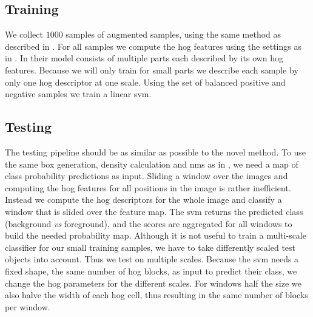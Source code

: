\subsection{Training}
We collect $1000$ samples of augmented samples, using the same method as described in . For all samples we compute the \gls{hog} features using the settings as in \citep{dalal_histograms_2005}. In \citet{felzenszwalb_object_2010} their model consists of multiple parts each described by its own \gls{hog} features. Because we will only train for small parts we describe each sample by only one \gls{hog} descriptor at one scale. Using the set of balanced positive and negative samples we train a linear \gls{svm}.
\clearpage
\subsection{Testing}
The testing pipeline should be as similar as possible to the novel method. To use the same box generation, density calculation and \gls{nms} as in , we need a map of class probability predictions as input. Sliding a window over the images and computing the \gls{hog} features for all positions in the image is rather inefficient. Instead we compute the \gls{hog} descriptors for the whole image and classify a window that is slided over the feature map. The \gls{svm} returns the predicted class (background \textit{vs} foreground), and the scores are aggregated for all windows to build the needed probability map. Although it is not useful to train a multi-scale classifier for our small training samples, we have to take differently scaled test objects into account. Thus we test on multiple scales. Because the \gls{svm} needs a fixed shape, the same number of \gls{hog} blocks, as input to predict their class, we change the \gls{hog} parameters for the different scales. For windows half the size we also halve the width of each \gls{hog} cell, thus resulting in the same number of blocks per window.

\clearpage
